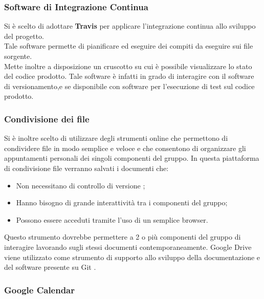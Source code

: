 \subsubsection{Software di Integrazione Continua}

Si è scelto di adottare \textbf{Travis} per applicare l’integrazione continua allo sviluppo del progetto.\\ 
Tale software permette di pianificare ed eseguire dei compiti da eseguire sui file sorgente.\\
Mette inoltre a disposizione un cruscotto su cui è possibile visualizzare lo stato del codice prodotto. Tale software è infatti in grado di interagire con il software di versionamento,e se disponibile con software per l’esecuzione di test sul codice prodotto.\\ 



\subsubsection{Condivisione dei file}
  \label{sec:condivisioneFile}
  Si è inoltre scelto di utilizzare degli strumenti online che permettono di condividere file
  in modo semplice e veloce e che consentono di organizzare gli appuntamenti personali
  dei singoli componenti del gruppo.
  In questa piattaforma di condivisione file verranno salvati i documenti che:
  \begin{itemize}
  
  
  \item Non necessitano di controllo di versione ;
  \item Hanno bisogno di grande interattività tra i componenti del gruppo;
  \item Possono essere acceduti tramite l’uso di un semplice browser.
   \end{itemize}
  Questo strumento dovrebbe permettere a 2 o più componenti del gruppo di interagire
  lavorando sugli stessi documenti contemporaneamente. Google Drive viene utilizzato
  come strumento di supporto allo sviluppo della documentazione e del software presente
  su Git .
  


\subsubsection{Google Calendar}
 
